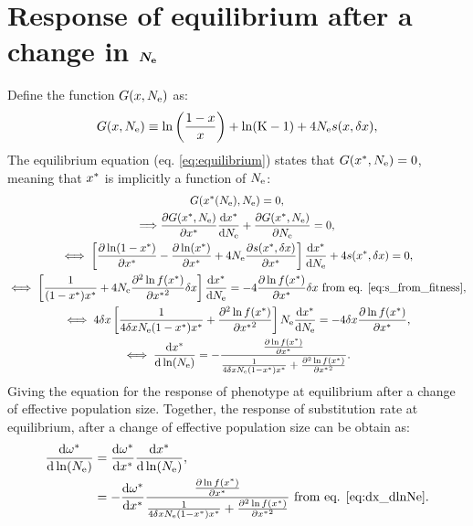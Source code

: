 \documentclass{article}
\begin{document}
\section*{Response of equilibrium after a change in $\bm{N_{\mathrm{e}}}$}
Define the function $G(x, N_{\mathrm{e}} )$ as:
\begin{gather}
G(x, N_{\mathrm{e}} ) \equiv \ln \left( \frac{1 - x}{x} \right) + \ln (\text{K}-1) + 4 N_{\mathrm{e}} s(x, \delta x), 
\end{gather}
The equilibrium equation (eq. \ref{eq:equilibrium}) states that $G(x^{*}, N_{\mathrm{e}} )=0$, meaning that $x^{*}$ is implicitly a function of $N_{\mathrm{e}}$:
\begin{gather}
G(x^{*}(N_{\mathrm{e}}), N_{\mathrm{e}} ) = 0, \\
\Longrightarrow \frac{\partial G(x^{*}, N_{\mathrm{e}} ) }{\partial x^{*} }\frac{ \mathrm{d} x^{*}}{\mathrm{d} N_{\mathrm{e}}} + \frac{ \partial G(x^{*}, N_{\mathrm{e}} )}{\partial N_{\mathrm{e}}} = 0, \\
\iff \left[ \frac{\partial \ln (1-x^{*}) }{\partial x^{*} } - \frac{\partial \ln (x^{*}) }{\partial x^{*}}  + 4 N_{\mathrm{e}} \frac{ \partial s(x^{*}, \delta x) }{\partial x^{*} } \right]\frac{ \mathrm{d} x^{*}}{\mathrm{d} N_{\mathrm{e}}} + 4 s(x^{*}, \delta x) = 0, \\
\iff \left[ \frac{1}{(1 - x^{*}) x^{*}} + 4 N_{\mathrm{e}} \frac{ \partial^2 \ln f(x^{*}) }{\partial {x^{*}}^2}\delta x \right]\frac{ \mathrm{d} x^{*}}{\mathrm{d} N_{\mathrm{e}}}  = - 4 \frac{ \partial \ln f(x^{*}) }{\partial {x^{*}}}\delta x \text{ from eq. \ref{eq:s_from_fitness}}, \\
\iff 4 \delta x \left[ \frac{1}{4 \delta x N_{\mathrm{e}}  (1 - x^{*}) x^{*}} + \frac{ \partial^2 \ln f(x^{*}) }{\partial {x^{*}}^2} \right] N_{\mathrm{e}} \frac{ \mathrm{d} x^{*}}{\mathrm{d} N_{\mathrm{e}}}  = - 4 \delta x \frac{ \partial \ln f(x^{*}) }{\partial {x^{*}}}, \\
\iff \frac{ \mathrm{d} x^{*}}{\mathrm{d} \ln (N_{\mathrm{e}})}  = - \frac{\frac{ \partial \ln f(x^{*}) }{\partial {x^{*}}}}{\frac{1}{4 \delta x N_{\mathrm{e}}  (1 - x^{*}) x^{*}} + \frac{ \partial^2 \ln f(x^{*}) }{\partial {x^{*}}^2}}  \label{eq:dx_dlnNe}.
\end{gather}
Giving the equation for the response of phenotype at equilibrium after a change of effective population size.
Together, the response of substitution rate at equilibrium, after a change of effective population size can be obtain as:
\begin{align}
\frac{\mathrm{d} \omega^{*}}{\mathrm{d} \ln (N_{\mathrm{e}})} & = \frac{\mathrm{d} \omega^{*}}{\mathrm{d} x^{*}} \frac{ \mathrm{d} x^{*}}{\mathrm{d} \ln (N_{\mathrm{e}})}, \\
 &= - \frac{\mathrm{d} \omega^{*}}{\mathrm{d} x^{*}} \frac{\frac{ \partial \ln f(x^{*}) }{\partial {x^{*}}}}{\frac{1}{4 \delta x N_{\mathrm{e}}  (1 - x^{*}) x^{*}} + \frac{ \partial^2 \ln f(x^{*}) }{\partial {x^{*}}^2}} \text{ from eq. \ref{eq:dx_dlnNe}} \label{eq:dw_dlnNe}.
\end{align}
\end{document}
